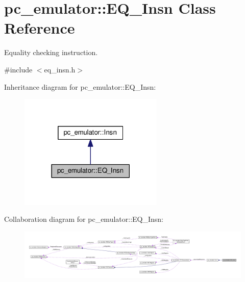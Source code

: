 \hypertarget{classpc__emulator_1_1EQ__Insn}{}\section{pc\+\_\+emulator\+:\+:E\+Q\+\_\+\+Insn Class Reference}
\label{classpc__emulator_1_1EQ__Insn}


Equality checking instruction.  




{\ttfamily \#include $<$eq\+\_\+insn.\+h$>$}



Inheritance diagram for pc\+\_\+emulator\+:\+:E\+Q\+\_\+\+Insn\+:\nopagebreak
\begin{figure}[H]
\begin{center}
\leavevmode
\includegraphics[width=194pt]{classpc__emulator_1_1EQ__Insn__inherit__graph}
\end{center}
\end{figure}


Collaboration diagram for pc\+\_\+emulator\+:\+:E\+Q\+\_\+\+Insn\+:\nopagebreak
\begin{figure}[H]
\begin{center}
\leavevmode
\includegraphics[width=350pt]{classpc__emulator_1_1EQ__Insn__coll__graph}
\end{center}
\end{figure}
